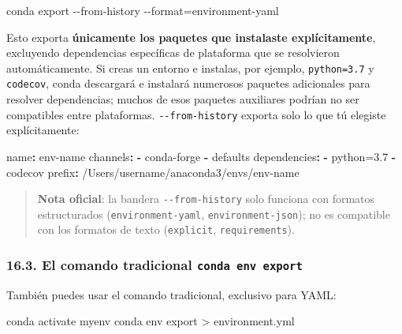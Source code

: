 \documentclass[
  doc,
  floatsintext,
  longtable,
  a4paper,
  nolmodern,
  notxfonts,
  notimes,
  12pt,
  colorlinks=true,linkcolor=blue,citecolor=blue,urlcolor=blue]{apa7}
\newenvironment{Shaded}{\begin{snugshade}}{\end{snugshade}}
\newcommand{\AttributeTok}[1]{\textcolor[rgb]{0.40,0.45,0.13}{#1}}
\newcommand{\ExtensionTok}[1]{\textcolor[rgb]{0.00,0.23,0.31}{#1}}
\newcommand{\FunctionTok}[1]{\textcolor[rgb]{0.28,0.35,0.67}{#1}}
\newcommand{\KeywordTok}[1]{\textcolor[rgb]{0.00,0.23,0.31}{\textbf{#1}}}
\newcommand{\NormalTok}[1]{\textcolor[rgb]{0.00,0.23,0.31}{#1}}
\newcommand{\OperatorTok}[1]{\textcolor[rgb]{0.37,0.37,0.37}{#1}}
\begin{document}
\begin{Shaded}
\begin{Highlighting}[]
\ExtensionTok{conda}\NormalTok{ export }\AttributeTok{{-}{-}from{-}history} \AttributeTok{{-}{-}format}\OperatorTok{=}\NormalTok{environment{-}yaml}
\end{Highlighting}
\end{Shaded}

Esto exporta \textbf{únicamente los paquetes que instalaste
explícitamente}, excluyendo dependencias específicas de plataforma que
se resolvieron automáticamente. Si creas un entorno e instalas, por
ejemplo, \texttt{python=3.7} y \texttt{codecov}, conda descargará e
instalará numerosos paquetes adicionales para resolver dependencias;
muchos de esos paquetes auxiliares podrían no ser compatibles entre
plataformas. \texttt{-\/-from-history} exporta solo lo que tú elegiste
explícitamente:

\begin{Shaded}
\begin{Highlighting}[]
\FunctionTok{name}\KeywordTok{:}\AttributeTok{ env{-}name}
\FunctionTok{channels}\KeywordTok{:}
\AttributeTok{  }\KeywordTok{{-}}\AttributeTok{ conda{-}forge}
\AttributeTok{  }\KeywordTok{{-}}\AttributeTok{ defaults}
\FunctionTok{dependencies}\KeywordTok{:}
\AttributeTok{  }\KeywordTok{{-}}\AttributeTok{ python=3.7}
\AttributeTok{  }\KeywordTok{{-}}\AttributeTok{ codecov}
\FunctionTok{prefix}\KeywordTok{:}\AttributeTok{ /Users/username/anaconda3/envs/env{-}name}
\end{Highlighting}
\end{Shaded}

\begin{quote}
\textbf{Nota oficial}: la bandera \texttt{-\/-from-history} solo
funciona con formatos estructurados (\texttt{environment-yaml},
\texttt{environment-json}); no es compatible con los formatos de texto
(\texttt{explicit}, \texttt{requirements}).
\end{quote}

\subsubsection{\texorpdfstring{16.3. El comando tradicional
\texttt{conda\ env\ export}}{16.3. El comando tradicional conda env export}}\label{el-comando-tradicional-conda-env-export}

También puedes usar el comando tradicional, exclusivo para YAML:

\begin{Shaded}
\begin{Highlighting}[]
\ExtensionTok{conda}\NormalTok{ activate myenv}
\ExtensionTok{conda}\NormalTok{ env export }\OperatorTok{\textgreater{}}\NormalTok{ environment.yml}
\end{Highlighting}
\end{Shaded}
\end{document}
